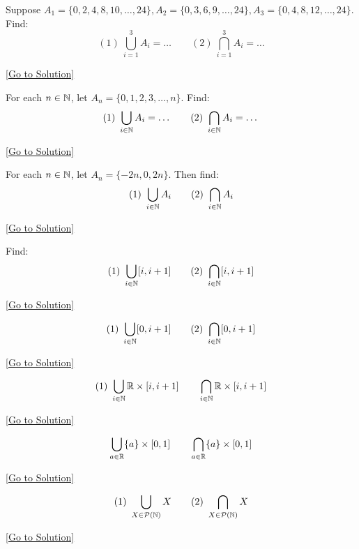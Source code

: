 \begin{exercise}\label{ex:8.2}
    Suppose $A_{1}=\{ 0,2,4,8,10,\dots,24 \}, A_{2}=\{ 0,3,6,9,\dots,24 \}, A_{3}=\{ 0,4,8,12,\dots,24 \}$. Find: 
    $$
    (1)~ \bigcup^{3}_{i=1}A_{i}=\dots \quad\quad (2)~ \bigcap^{3}_{i=1}A_{i}=\dots
    $$
\end{exercise}\hyperref[sol:8.2]{[Go to Solution]}

\begin{exercise}\label{ex:8.3}
    For each $n\in\mathbb{N}$, let $A_{n} = \{ 0,1,2,3,\dots,n \}$. Find: 
    $$
    (1)~\bigcup_{i\in\mathbb{N}}A_i=\dots \quad\quad (2)~ \bigcap_{i\in\mathbb{N}}A_{i}=\dots
    $$
\end{exercise}\hyperref[sol:8.3]{[Go to Solution]}

\begin{exercise}\label{ex:8.4}
    For each $n\in\mathbb{N}$, let $A_{n}=\{ -2n,0,2n \}$. Then find: 
    $$
        (1)~\bigcup_{i\in\mathbb{N}}A_{i}\quad\quad
        (2)~\bigcap_{i\in\mathbb{N}} A_{i}
    $$
\end{exercise}\hyperref[sol:8.4]{[Go to Solution]}

\begin{exercise}\label{ex:8.5}
    Find: 
    $$
    (1)~\bigcup_{i\in\mathbb{N}}[i,i+1]\quad \quad
    (2)~\bigcap_{i\in\mathbb{N}}[i,i+1]
    $$
\end{exercise}\hyperref[sol:8.5]{[Go to Solution]}

\begin{exercise}\label{ex:8.6}

$$
(1)~ \bigcup_{i\in\mathbb{N}}[0,i+1]\quad\quad (2)~\bigcap_{i\in\mathbb{N}}[0,i+1]
$$
\end{exercise}\hyperref[sol:8.6]{[Go to Solution]}

\begin{exercise}\label{ex:8.7}
    
    $$
    (1)~\bigcup_{i\in\mathbb{N}}\mathbb{R}\times[i,i+1]\quad \quad \bigcap_{i\in\mathbb{N}}\mathbb{R}\times[i,i+1]
    $$
    
\end{exercise}\hyperref[sol:8.7]{[Go to Solution]}

\begin{exercise}\label{ex:8.8}
    
    $$
    \bigcup_{a\in\mathbb{R}}\{ a \}\times[0,1]\quad\quad \bigcap_{a\in\mathbb{R}}\{ a \}\times[0,1]
    $$
    
\end{exercise}\hyperref[sol:8.8]{[Go to Solution]}

\begin{exercise}\label{ex:8.9}
    $$
    (1)~ \bigcup_{X\in\mathcal{P}(\mathbb{N})}X\quad \quad 
    (2)~ \bigcap_{X\in\mathcal{P}(\mathbb{N})}X
    $$
\end{exercise}\hyperref[sol:8.9]{[Go to Solution]}


